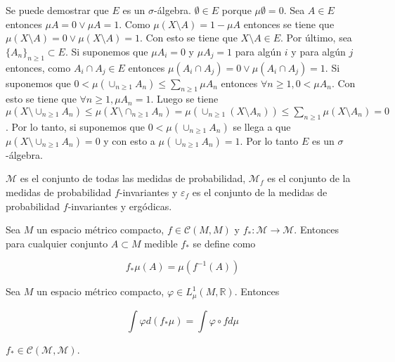 Se puede demostrar que $E$ es un $\sigma$-álgebra. $\emptyset \in E$ porque $\mu \emptyset = 0$. Sea $A \in E$ entonces $\mu A = 0 \vee \mu A = 1$. Como $\mu(X \setminus A) = 1 - \mu A$ entonces se tiene que $\mu(X \setminus A) = 0 \vee \mu(X \setminus A) = 1$. Con esto se tiene que $X \setminus A \in E$. Por último, sea $\{A_n\}_{n \geq 1} \subset E$. Si suponemos que $\mu A_i = 0$ y $\mu A_j = 1$ para algún $i$ y para algún $j$ entonces, como $A_i \cap A_j \in E$ entonces $\mu(A_i \cap A_j) = 0 \vee \mu(A_i \cap A_j) = 1$. Si suponemos que $0 < \mu(\cup_{n \geq 1} A_n) \leq \sum_{n \geq 1} \mu A_n$ entonces $\forall n \geq 1, 0 < \mu A_n$. Con esto se tiene que $\forall n \geq 1, \mu A_n = 1$. Luego se tiene $\mu(X \setminus \cup_{n \geq 1} A_n) \leq \mu(X \setminus \cap_{n \geq 1} A_n) = \mu(\cup_{n \geq 1} (X \setminus A_n)) \leq \sum_{n \geq 1} \mu(X \setminus A_n) = 0$. Por lo tanto, si suponemos que $0 < \mu(\cup_{n \geq 1} A_n)$  se llega a que $\mu(X \setminus \cup_{n \geq 1} A_n) = 0$ y con esto a $\mu(\cup_{n \geq 1} A_n) = 1$. Por lo tanto $E$ es un $\sigma$-álgebra.

\begin{definicion}
	$\mathcal{M}$ es el conjunto de todas las medidas de probabilidad, $\mathcal{M}_f$ es el conjunto de la medidas de probabilidad $f$-invariantes y $\varepsilon_f$ es el conjunto de la medidas de probabilidad $f$-invariantes y ergódicas.
\end{definicion}

\begin{definicion}
	Sea $M$ un espacio métrico compacto, $f \in \mathcal{C}(M,M)$ y $f_*: \mathcal{M} \rightarrow \mathcal{M}$. Entonces para cualquier conjunto $A \subset M$ medible $f_*$ se define como
	
	\begin{equation}
		f_*\mu(A) = \mu(f^{-1}(A))
	\end{equation}
\end{definicion}

\begin{lema}\label{lema1_krylov-bugoliubov}
	Sea $M$ un espacio métrico compacto, $\varphi \in L^1_\mu (M,\mathbb{R})$. Entonces
	
	\begin{equation}
		\int \varphi d(f_*\mu)=\int \varphi \circ f d\mu
	\end{equation}
\end{lema}

\begin{lema}
	$f_* \in \mathcal{C}(\mathcal{M},\mathcal{M})$. 
\end{lema}

